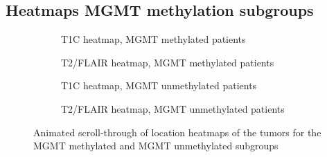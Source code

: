\begin{subappendices}
    \section{Heatmaps MGMT methylation subgroups}
    \begin{figure}[H]
        \centering
        \begin{subfigure}[t]{0.4\textwidth}
            \centering
            \caption{\acrshort{T1C} heatmap, \gls{MGMT} methylated patients}\label{fig:HGG_loc_T1_heatmap_methylated}
        \end{subfigure}
        \hfill
        \begin{subfigure}[t]{0.4\textwidth}
            \centering
            \caption{\acrshort{T2}/\acrshort{FLAIR} heatmap, \gls{MGMT} methylated patients}\label{fig:HGG_loc_T2_heatmap_methylated}
        \end{subfigure}

        \begin{subfigure}[t]{0.4\textwidth}
            \centering
            \caption{\acrshort{T1C} heatmap, \acrshort{MGMT} unmethylated patients}\label{fig:HGG_loc_T1_heatmap_unmethylated}
        \end{subfigure}
        \hfill
        \begin{subfigure}[t]{0.4\textwidth}
            \centering
            \caption{\acrshort{T2}/\acrshort{FLAIR} heatmap, \acrshort{MGMT} unmethylated patients}\label{fig:HGG_loc_T2_heatmap_unmethylated}
        \end{subfigure}
        \caption{Animated scroll-through of location heatmaps of the \glspl{tumor} for the MGMT methylated and MGMT unmethylated subgroups}\label{fig:HGG_local_heatmaps_subgroups}
    \end{figure}


    \newpage

\end{subappendices}
